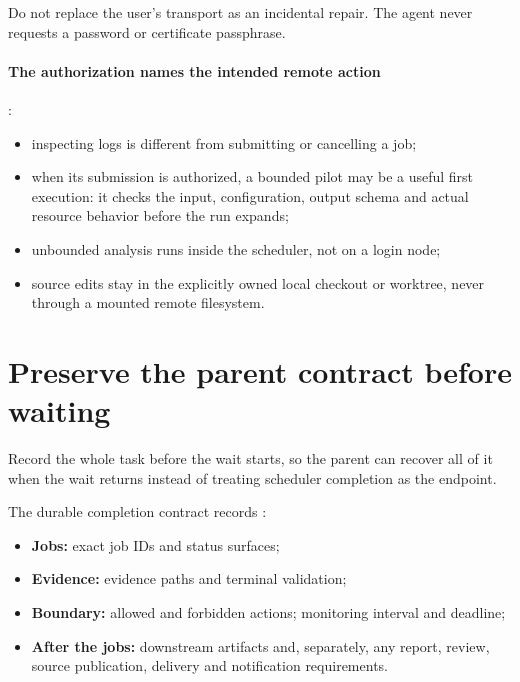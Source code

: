 \begin{rulebox}[SSH]
  Do not replace the user's transport as an incidental repair. The agent never requests a
  password or certificate passphrase.
\end{rulebox}

\paragraph{The authorization names the intended remote action}
\cite[Remote checkouts and execution; Scheduler jobs]{skill:remote}:
\begin{itemize}
  \item inspecting logs is different from submitting or cancelling a job;
  \item when its submission is authorized, a bounded pilot may be a useful first execution: it
        checks the input, configuration, output schema and actual resource behavior before the
        run expands;
  \item unbounded analysis runs inside the scheduler, not on a login node;
  \item source edits stay in the explicitly owned local checkout or worktree, never through a
        mounted remote filesystem.
\end{itemize}

\section{Preserve the parent contract before waiting}

\begin{headline}
  Record the whole task before the wait starts, so the parent can recover all of it when
  the wait returns instead of treating scheduler completion as the endpoint.
\end{headline}

The durable completion contract records \cite[Durable completion contract]{skill:jobs}:
\begin{itemize}
  \item \textbf{Jobs:} exact job IDs and status surfaces;
  \item \textbf{Evidence:} evidence paths and terminal validation;
  \item \textbf{Boundary:} allowed and forbidden actions; monitoring interval and deadline;
  \item \textbf{After the jobs:} downstream artifacts and, separately, any report, review, source
        publication, delivery and notification requirements.
\end{itemize}

